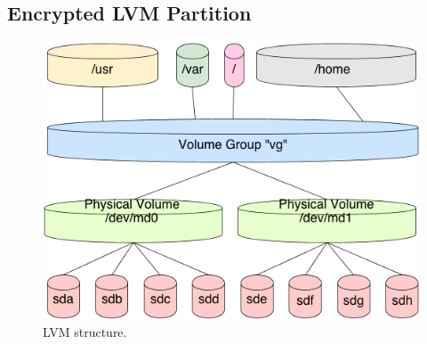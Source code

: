 \documentclass[10pt, a4paper, onecolumn, oneside, titlepage, openany]{book}
\begin{document}
\subsection{Encrypted LVM Partition}
\begin{figure}[ht]
    \begin{center}
        \includegraphics[width=115mm]{./src/img/lvm.png}
        \caption{LVM structure.}
        \label{fig:1}
    \end{center}
\end{figure}
\end{document}

